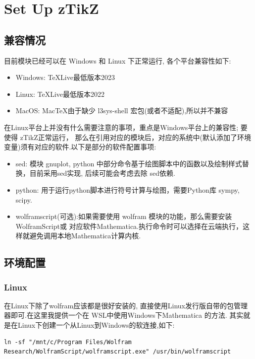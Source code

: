 \documentclass[
  hyper,    
  lang=cn,
  class=book,
  bib_index={load},
  mathSpec={envStyle=leftbar, alias},
  toc={column=2, title=目录},
]{zlatex}
\let\cmd\ztexverb
\begin{document}
\section{Set Up zTikZ}
\subsection{兼容情况}
目前\cmd{zTikZ}模块已经可以在 Windows 和 Linux 下正常运行, 各个平台兼容性如下:

\hspace*{10em}\parbox{8cm}{
\begin{itemize}
  \item Windows: \TeX{}Live最低版本2023
  \item Linux: \TeX{}Live最低版本2022
  \item MacOS: Mac\TeX{}由于缺少 {l3sys-shell} 宏包(或者不适配),所以并不兼容
\end{itemize}}

在Linux平台上并没有什么需要注意的事项，重点是Windows平台上的兼容性; 要使得 {zTikZ}正常运行，
那么在引用对应的模块后，对应的系统中(默认添加了环境变量)须有对应的软件.以下是部分的软件配置事项:
\begin{itemize}
  \item {sed}: 模块 gnuplot, python 中部分命令基于绘图脚本中的函数以及绘制样式替换，目前采用sed实现,
    后续可能会考虑去除 {sed}依赖.
  \item {python}: 用于运行python脚本进行符号计算与绘图，需要Python库 {sympy, scipy}.
  \item {wolframscript}(可选):如果需要使用 wolfram 模块的功能，那么需要安装WolframScript或
      对应软件Mathematica.执行命令时可以选择在云端执行，这样就避免调用本地Mathematica计算内核. 
\end{itemize}

\subsection{环境配置}
\subsubsection{Linux}
在Linux下除了wolfram应该都是很好安装的, 直接使用Linux发行版自带的包管理器即可.在这里我提供一个在
WSL中使用Windows下Mathematica 的方法. 其实就是在Linux下创建一个从Linux到Windows的软连接,如下:

\begin{verbatim}
ln -sf "/mnt/c/Program Files/Wolfram Research/WolframScript/wolframscript.exe" /usr/bin/wolframscript    
\end{verbatim}
\end{document}
